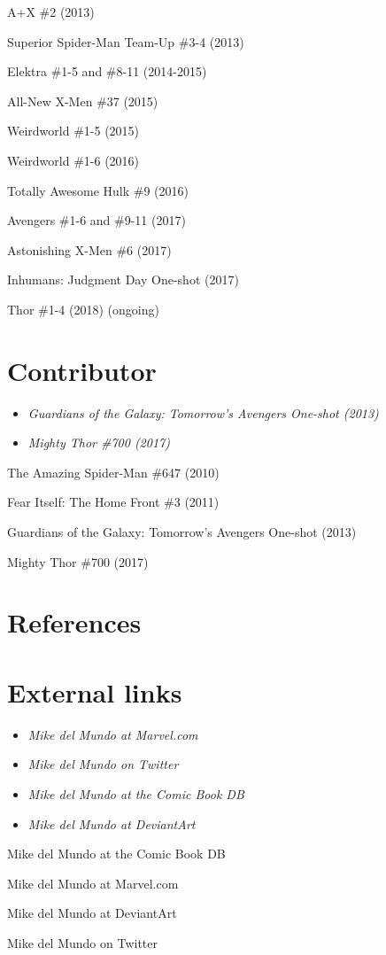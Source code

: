 A+X \#2 (2013)

Superior Spider-Man Team-Up \#3-4 (2013)

Elektra \#1-5 and \#8-11 (2014-2015)

All-New X-Men \#37 (2015)

Weirdworld \#1-5 (2015)

Weirdworld \#1-6 (2016)

Totally Awesome Hulk \#9 (2016)

Avengers \#1-6 and \#9-11 (2017)

Astonishing X-Men \#6 (2017)

Inhumans: Judgment Day One-shot (2017)

Thor \#1-4 (2018) (ongoing)

\section{Contributor}\label{contributor}

\begin{itemize}
\item
  \emph{Guardians of the Galaxy: Tomorrow's Avengers One-shot (2013)}
\item
  \emph{Mighty Thor \#700 (2017)}
\end{itemize}

The Amazing Spider-Man \#647 (2010)

Fear Itself: The Home Front \#3 (2011)

Guardians of the Galaxy: Tomorrow's Avengers One-shot (2013)

Mighty Thor \#700 (2017)

\section{References}\label{references}

\section{External links}\label{external-links}

\begin{itemize}
\item
  \emph{Mike del Mundo at Marvel.com}
\item
  \emph{Mike del Mundo on Twitter}
\item
  \emph{Mike del Mundo at the Comic Book DB}
\item
  \emph{Mike del Mundo at DeviantArt}
\end{itemize}

Mike del Mundo at the Comic Book DB

Mike del Mundo at Marvel.com

Mike del Mundo at DeviantArt

Mike del Mundo on Twitter
